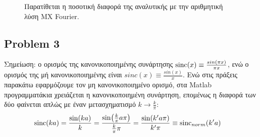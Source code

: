 \begin{itemize}
\newpage

\begin{figure}[htp]
\centering
{}\caption{ Παρατίθεται η ποσοτική διαφορά της αναλυτικής με την αριθμητική λύση ΜΧ Fourier.}\label{fig:7}
\end{figure}



\end{itemize}



\subsection{Problem 3}

Σημείωση: ο ορισμός της κανονικοποιημένης συνάρτησης $\operatorname{sinc}(x)\equiv \frac{sin(\pi x)}{\pi x}$, ενώ ο ορισμός της μή κανονικοποιημένης είναι $sinc(x)\equiv \frac{sin(x)}{x}$. Ενώ στις πράξεις παρακάτω εφαρμόζουμε τον μη κανονικοποιημένο ορισμό, στα Matlab προγραμματάκια χρειάζεται η κανονικοποιημένη συνάρτηση, επομένως η διαφορά των δύο φαίνεται απλώς με έναν μετασχηματισμό $k\rightarrow \frac{k}{\pi}$:
\begin{align*}
\operatorname{sinc}(ka)&=\frac{\sin(ka)}{k}= \frac{\sin(\frac{k}{\pi}a\pi)}{\frac{k}{\pi}\pi}=\frac{\sin(k'a\pi)}{k'\pi}\equiv \operatorname{sinc}_{norm}(k'a)
\end{align*}

